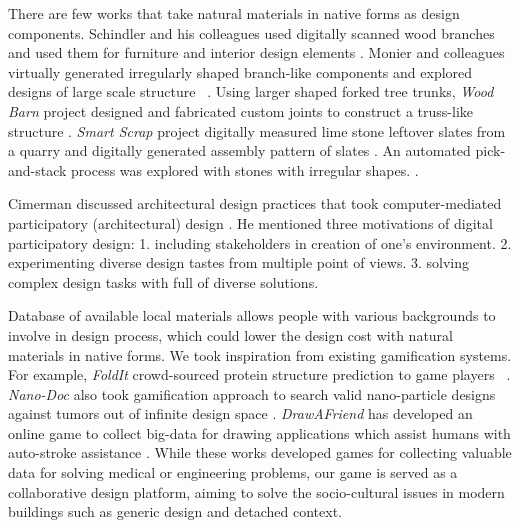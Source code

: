 There are few works that take natural materials in native forms as design components.
Schindler and his colleagues used digitally scanned wood branches and used them for furniture and interior design elements \cite{schindler2014processing}.
Monier and colleagues virtually generated irregularly shaped branch-like components and explored designs of large scale structure ~\cite{monier2013use}.
Using larger shaped forked tree trunks, \textit{Wood Barn} project designed and fabricated custom joints to construct a truss-like structure \cite{woodbarn}.
\textit{Smart Scrap} project digitally measured lime stone leftover slates from a quarry and digitally generated assembly pattern of slates \cite{smartscrap}.
An automated pick-and-stack process was explored with stones with irregular shapes. \cite{stonestacking}.

Cimerman discussed architectural design practices that took computer-mediated participatory (architectural) design \cite{cimerman2000participatory}.
He mentioned three motivations of digital participatory design:
1. including stakeholders in creation of one's environment.
2. experimenting diverse design tastes from multiple point of views.
3. solving complex design tasks with full of diverse solutions.

Database of available local materials allows people with various backgrounds to involve in design process, which could lower the design cost with natural materials in native forms.
We took inspiration from existing gamification systems.
For example, \textit{FoldIt} crowd-sourced protein structure prediction to game players ~\cite{cooper2010predicting}.
\textit{Nano-Doc} also took gamification approach to search valid nano-particle designs against tumors out of infinite design space \cite{hauert2013computational}.
\textit{DrawAFriend} has developed an online game to collect big-data for drawing applications which assist humans with auto-stroke assistance \cite{limpaecher2013real}.
While these works developed games for collecting valuable data for solving medical or engineering problems, our game is served as a collaborative design platform, aiming to solve the socio-cultural issues in modern buildings such as generic design and detached context.
